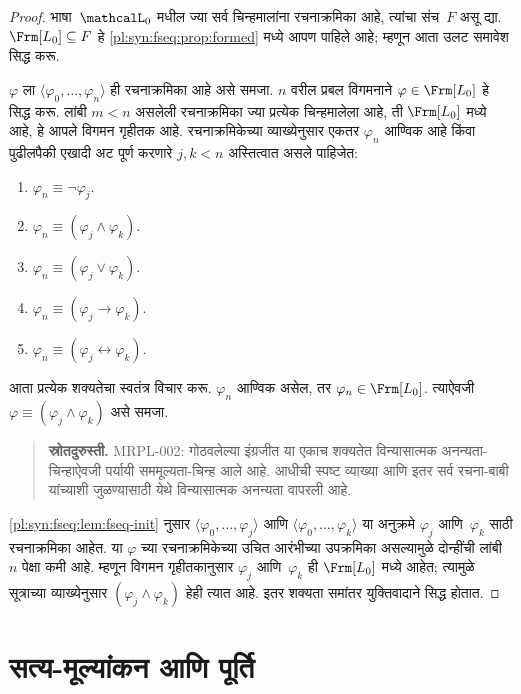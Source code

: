 \documentclass[11pt,a4paper,openany]{book}
\theoremstyle{definition}
\newcommand{\tuple}[1]{\langle #1\rangle}
\newcommand{\lif}{\mathbin{\to}}
\newcommand{\liff}{\mathbin{\leftrightarrow}}
\newcommand{\applytofirst}[2]{{\expandafter#1#2}}
\newcommand{\Lang}[1]{\applytofirst{\mathcal}{#1}}
\newcommand{\ident}{\equiv}
\begin{document}
\begin{proof}
भाषा~$\Lang L_0$ मधील ज्या सर्व चिन्हमालांना रचनाक्रमिका आहे, त्यांचा
संच~$F$ असू द्या. $\Frm[L_0] \subseteq F$ हे
\ref{pl:syn:fseq:prop:formed} मध्ये आपण पाहिले आहे; म्हणून आता उलट
समावेश सिद्ध करू.

$\varphi$ ला $\tuple{\varphi_0,\dotsc,\varphi_n}$ ही रचनाक्रमिका आहे असे समजा.
$n$ वरील प्रबल विगमनाने $\varphi \in \Frm[L_0]$ हे सिद्ध करू. लांबी
$m < n$ असलेली रचनाक्रमिका ज्या प्रत्येक चिन्हमालेला आहे, ती
$\Frm[L_0]$ मध्ये आहे, हे आपले विगमन गृहीतक आहे. रचनाक्रमिकेच्या
व्याख्येनुसार एकतर $\varphi_n$ आण्विक आहे किंवा पुढीलपैकी एखादी अट पूर्ण
करणारे $j,k < n$ अस्तित्वात असले पाहिजेत:
\begin{enumerate}
    \item $\varphi_n \ident \lnot \varphi_j$.%
    \item $\varphi_n \ident (\varphi_j \land \varphi_k)$.%
    \item $\varphi_n \ident (\varphi_j \lor \varphi_k)$.%
    \item $\varphi_n \ident (\varphi_j \lif \varphi_k)$.%
    \item $\varphi_n \ident (\varphi_j \liff \varphi_k)$.%
\end{enumerate}
आता प्रत्येक शक्यतेचा स्वतंत्र विचार करू. $\varphi_n$ आण्विक असेल, तर
$\varphi_n \in \Frm[L_0]$. त्याऐवजी $\varphi \ident
(\varphi_j \land \varphi_k)$ असे समजा.
\begin{quote}\small\textbf{स्रोतदुरुस्ती.} MRPL-002: गोठवलेल्या इंग्रजीत या एकाच शक्यतेत विन्यासात्मक अनन्यता-चिन्हाऐवजी पर्यायी सममूल्यता-चिन्ह आले आहे. आधीची स्पष्ट व्याख्या आणि इतर सर्व रचना-बाबी यांच्याशी जुळण्यासाठी येथे विन्यासात्मक अनन्यता वापरली आहे.\end{quote}
\ref{pl:syn:fseq:lem:fseq-init} नुसार
$\tuple{\varphi_0,\dotsc,\varphi_j}$ आणि $\tuple{\varphi_0,\dotsc,\varphi_k}$ या अनुक्रमे
$\varphi_j$ आणि~$\varphi_k$ साठी रचनाक्रमिका आहेत. या $\varphi$ च्या
रचनाक्रमिकेच्या उचित आरंभीच्या उपक्रमिका असल्यामुळे दोन्हींची लांबी
$n$ पेक्षा कमी आहे. म्हणून विगमन गृहीतकानुसार $\varphi_j$ आणि~$\varphi_k$ ही
$\Frm[L_0]$ मध्ये आहेत; त्यामुळे सूत्राच्या व्याख्येनुसार
$(\varphi_j \land \varphi_k)$ हेही त्यात आहे. इतर शक्यता समांतर युक्तिवादाने
सिद्ध होतात.
\end{proof}









\section{सत्य-मूल्यांकन आणि पूर्ति}\label{pl:syn:val:sec}
\end{document}
